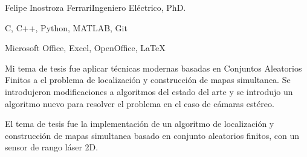 \documentclass{article}
\begin{document}
\begin{cv}[avatar]{Felipe Inostroza Ferrari}{Ingeniero Eléctrico, PhD.}
	\cvseparator

	\begin{cvitem}
		C, C++, Python, MATLAB, Git
	\end{cvitem}

	\cvseparator
	\begin{cvitem}
		Microsoft Office, Excel, OpenOffice, \LaTeX
	\end{cvitem}














\end{cv}

\clearpage
{}  %

\begin{cvevent}[2014][2023]
	Mi tema de tesis fue aplicar técnicas modernas basadas en Conjuntos Aleatorios Finitos a el problema de localización y construcción de mapas simultanea. Se introdujeron modificaciones a algoritmos del estado del arte y se introdujo un algoritmo nuevo para resolver el problema en el caso de cámaras estéreo.
\end{cvevent}

\begin{cvevent}[2012][2014]
	El tema de tesis fue la implementación de un algoritmo de localización y construcción de  mapas simultanea basado en conjunto aleatorios finitos, con un sensor de rango láser 2D.
\end{cvevent}
\begin{cvevent}[2007][2014]
\end{cvevent}
\begin{cvevent}[2007][2014]
\end{cvevent}
\end{document}
